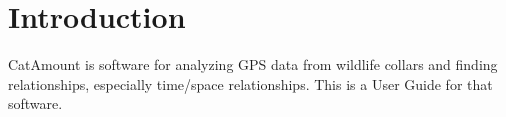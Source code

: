 \chapter{Introduction}

CatAmount is software for analyzing GPS data from wildlife collars and finding
relationships, especially time/space relationships. This is a User Guide for
that software.
